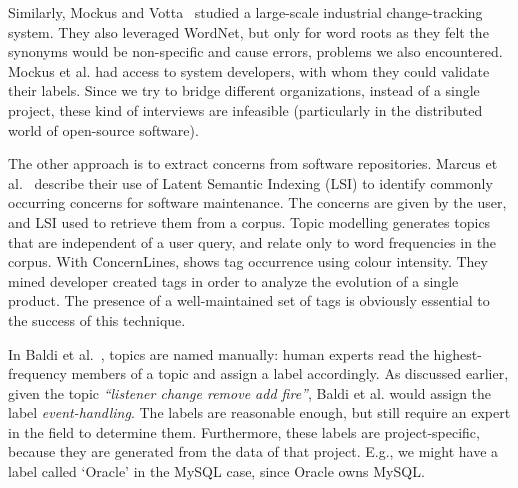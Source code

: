 \documentclass[]{sig-alternate}
\begin{document}
Similarly, Mockus and Votta~\cite{Mockus00} studied a large-scale industrial change-tracking system. 
They also leveraged WordNet, but only for word roots as they felt the synonyms would be non-specific and cause errors, problems we also encountered. 
Mockus et al. had access to system developers, with whom they could validate their labels. 
Since we try to bridge different organizations, instead of a single project, these kind of interviews are infeasible (particularly in the distributed world of open-source software).

The other approach is to extract concerns from software repositories.
Marcus et al.~\cite{marcus04wcre} describe their use of Latent Semantic Indexing (LSI) to identify commonly occurring concerns for software maintenance. The concerns are given by the user, and LSI used to retrieve them from a corpus. Topic modelling generates topics that are independent of a user query, and relate only to word frequencies in the corpus.
With ConcernLines, \cite{treude09cl} shows tag occurrence using colour intensity. 
They mined 
developer created tags 
in order to analyze the evolution of a single product.
The presence of a well-maintained set of tags is obviously essential to the success of this technique.


In Baldi et al.~\cite{Baldi2008}, topics are named manually: human experts read the highest-frequency members of a topic and assign a label accordingly. 
As discussed earlier, given the topic \emph{``listener change remove add fire''}, Baldi et al. would assign the label \emph{event-handling}. 
The labels are reasonable enough, but still require an expert in the field to determine them. 
Furthermore, these labels are project-specific, because they are generated from the data of that project. E.g., we might have a label called `Oracle' in the MySQL case, since Oracle owns MySQL. 
\end{document}
